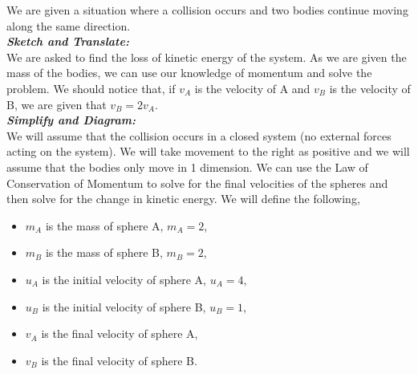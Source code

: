 %
%
%

\begin{subquestions}
	
\subquestion


\begin{subsubquestions}
	
\subsubquestion

We are given a situation where a collision occurs and two bodies continue moving along the same direction.\\

\textbf{\textit{Sketch and Translate:}} \\
We are asked to find the loss of kinetic energy of the system. As we are given the mass of the bodies, we can use our knowledge of momentum and solve the problem. We should notice that, if $v_A$ is the velocity of A and $v_B$ is the velocity of B, we are given that $v_B=2v_A$. \\



\textbf{\textit{Simplify and Diagram:}} \\
We will assume that the collision occurs in a closed system (no external forces acting on the system). We will take movement to the right as positive and we will assume that the bodies only move in 1 dimension. We can use the Law of Conservation of Momentum to solve for the final velocities of the spheres and then solve for the change in kinetic energy. We will define the following,
\begin{itemize}
	\item $m_A$ is the mass of sphere A, $m_A=2$,
	\item $m_B$ is the mass of sphere B, $m_B=2$,
	\item $u_A$ is the initial velocity of sphere A, $u_A=4$,
	\item $u_B$ is the initial velocity of sphere B, $u_B=1$,
	\item $v_A$ is the final velocity of sphere A,
	\item $v_B$ is the final velocity of sphere B.
\end{itemize}





\end{subsubquestions}
\end{subquestions}
